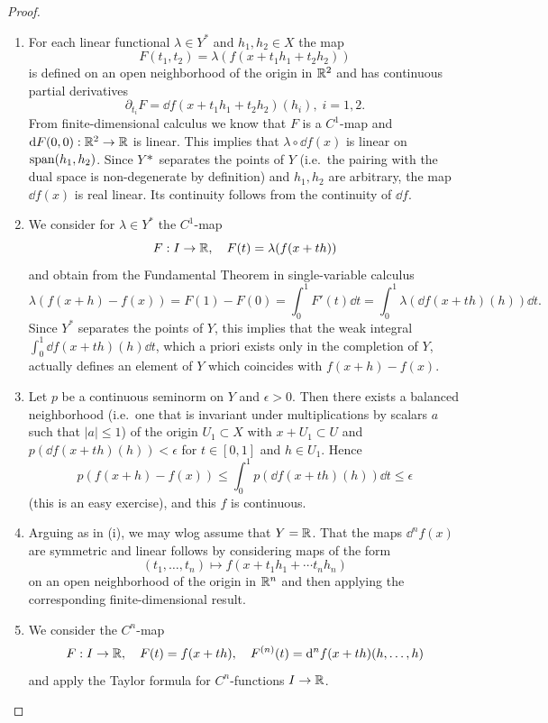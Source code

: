 \begin{proof}
    \begin{enumerate}[label=(\roman*)]
        \item For each linear functional $\lambda\in Y^\ast$ and $h_1,h_2\in X$ the map
        \[F(t_1,t_2)=\lambda(f(x+t_1h_1+t_2h_2))\]
        is defined on an open neighborhood of the origin in $\mathbb{R}^2$ and has continuous partial derivatives 
        \[\partial_{t_i}F=\dd f(x+t_1h_1+t_2h_2)(h_i),\; i=1,2.\]
        From finite-dimensional calculus we know that $F$ is a $C^1$-map and ${\mathrm{d}} F(0,0):\mathbb{R}^2\to \mathbb{R}$ is linear. This implies that $\lambda\circ \dd f(x)$ is linear on $\operatorname{span}(h_1,h_2)$. Since $Y\ast$ separates the points of $Y$ (i.e.\ the pairing with the dual space is non-degenerate by definition) and $h_1,h_2$ are arbitrary, the map $\dd f(x)$ is real linear. Its continuity follows from the continuity of $\dd f$.

        \item We consider for $\lambda \in Y^\ast$ the $C^1$-map
        \[F:I\to \mathbb{R},\quad F(t)=\lambda(f(x+th))\]
        and obtain from the Fundamental Theorem in single-variable calculus
        \[\lambda(f(x+h)-f(x))=F(1)-F(0)=\int_0^1 F'(t)\dd t=\int_0^1 \lambda(\dd f(x+th)(h))\dd t.\]
        Since $Y^\ast$ separates the points of $Y$, this implies that the weak integral $\int_0^1 \dd f(x+th)(h)\dd t$, which a priori exists only in the completion of $Y$, actually defines an element of $Y$ which coincides with $f(x+h)-f(x)$.

        \item Let $p$ be a continuous seminorm on $Y$ and $\epsilon>0$. Then there exists a balanced neighborhood (i.e.\ one that is invariant under multiplications by scalars $a$ such that $|a|\leq 1$) of the origin $U_1\subset X$ with $x+U_1\subset U$ and $p(\dd f(x+th)(h))<\epsilon$ for $t\in[0,1]$ and $h\in U_1$. Hence
        \[p(f(x+h)-f(x))\leq \int_0^1 p(\dd f(x+th)(h))\dd t\leq \epsilon\]
        (this is an easy exercise), and this $f$ is continuous.
        
        \item Arguing as in (i), we may \gls{wlog} assume that $Y=\mathbb{R}$. That the maps $\dd^n f(x)$ are symmetric and linear follows by considering maps of the form
        \[(t_1,\ldots,t_n)\mapsto f(x+t_1h_1+\cdots t_nh_n)\]
        on an open neighborhood of the origin in $\mathbb{R}^n$ and then applying the corresponding finite-dimensional result.
        
        \item We consider the $C^n$-map
        \[F:I\to \mathbb{R}, \quad F(t)=f(x+th), \quad F^{(n)}(t)={\mathrm{d}}^n f(x+th)(h,\ldots,h)\]
        and apply the Taylor formula for $C^n$-functions $I\to \mathbb{R}$.
    \end{enumerate}
\end{proof}

